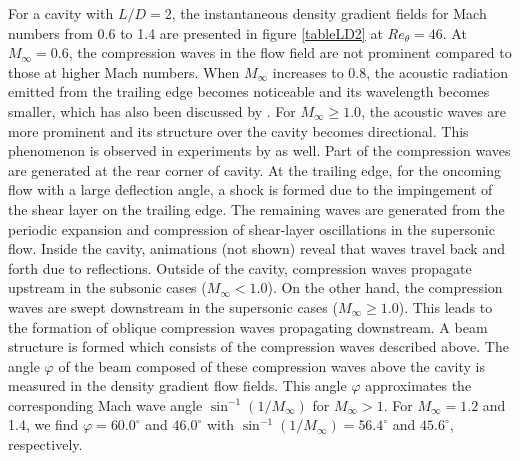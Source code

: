\documentclass{jfm}
\begin{document}
For a cavity with $L/D=2$, the instantaneous density gradient fields for Mach numbers from 0.6 to 1.4 are presented in figure \ref{tableLD2} at $Re_\theta = 46$. At $M_\infty=0.6$, the compression waves in the flow field are not prominent compared to those at higher Mach numbers. When $M_\infty$ increases to 0.8, the acoustic radiation emitted from the trailing edge becomes noticeable and its wavelength becomes smaller, which has also been discussed by \cite{Rowley:JFM02}. For $M_\infty \ge 1.0$, the acoustic waves are more prominent and its structure over the cavity becomes directional. This phenomenon is observed in experiments by \cite{Krishnamurty:1956} as well. Part of the compression waves are generated at the rear corner of cavity. At the trailing edge, for the oncoming flow with a large deflection angle, a shock is formed due to the impingement of the shear layer on the trailing edge. The remaining waves are generated from the periodic expansion and compression of shear-layer oscillations in the supersonic flow. Inside the cavity, animations (not shown) reveal that waves travel back and forth due to reflections. Outside of the cavity, compression waves propagate upstream in the subsonic cases ($M_\infty < 1.0$). On the other hand, the compression waves are swept downstream in the supersonic cases ($M_\infty \ge 1.0$). This leads to the formation of oblique compression waves propagating downstream. A beam structure is formed which consists of the compression waves described above. The angle $\varphi$ of the beam composed of these compression waves above the cavity is measured in the density gradient flow fields. This angle $\varphi$ approximates the corresponding Mach wave angle $\sin^{-1}(1/M_\infty)$ for $M_\infty >1$. For $M_\infty=1.2$ and 1.4, we find $\varphi=60.0^\circ$ and $46.0^{\circ}$ with $\sin^{-1} (1/M_\infty)=56.4^\circ$ and $45.6^\circ$, respectively.
\end{document}
